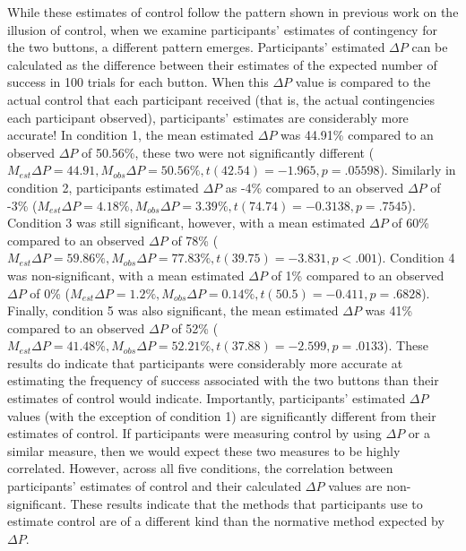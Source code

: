 \documentclass[USenglish,letterpaper,12pt,extrafontsizes,oneside,onecolumn,final]{memoir}
\newcommand{\deltap}{$\Delta P$}
\begin{document}
While these estimates of control follow the pattern shown in previous work on the illusion of control, when we examine participants' estimates of contingency for the two buttons, a different pattern emerges.  Participants' estimated $\Delta P$ can be calculated as the difference between their estimates of the expected number of success in 100 trials for each button.  When this $\Delta P$ value is compared to the actual control that each participant received (that is, the actual contingencies each participant observed), participants' estimates are considerably more accurate!  In condition 1, the mean estimated $\Delta P$ was 44.91\% compared to an observed $\Delta P$ of 50.56\%, these two were not significantly different ($M_{est} \Delta P =44.91, M_{obs} \Delta P = 50.56\%, t(42.54)=-1.965, p=.05598$).  Similarly in condition 2, participants estimated $\Delta P$ as -4\% compared to an observed $\Delta P$ of -3\% ($M_{est} \Delta P =4.18\%, M_{obs} \Delta P = 3.39\%, t(74.74)=-0.3138, p=.7545$).  Condition 3 was still significant, however, with a mean estimated $\Delta P$ of 60\% compared to an observed $\Delta P$ of 78\% ($M_{est} \Delta P =59.86\%, M_{obs} \Delta P = 77.83\%, t(39.75)=-3.831, p<.001$).  Condition 4 was non-significant, with a mean estimated $\Delta P$ of 1\% compared to an observed $\Delta P$ of 0\% ($M_{est} \Delta P =1.2\%, M_{obs} \Delta P = 0.14\%, t(50.5)=-0.411, p=.6828$).  Finally, condition 5 was also significant, the mean estimated $\Delta P$ was 41\% compared to an observed $\Delta P$ of 52\% ($M_{est} \Delta P =41.48\%, M_{obs} \Delta P = 52.21\%, t(37.88)=-2.599, p=.0133$).  These results do indicate that participants were considerably more accurate at estimating the frequency of success associated with the two buttons than their estimates of control would indicate.  Importantly, participants' estimated $\Delta P$ values (with the exception of condition 1) are significantly different from their estimates of control.  If participants were measuring control by using $\Delta P$ or a similar measure, then we would expect these two measures to be highly correlated.  However, across all five conditions, the correlation between participants' estimates of control and their calculated $\Delta P$ values are non-significant. These results indicate that the methods that participants use to estimate control are of a different kind than the normative method expected by \deltap.
\end{document}
